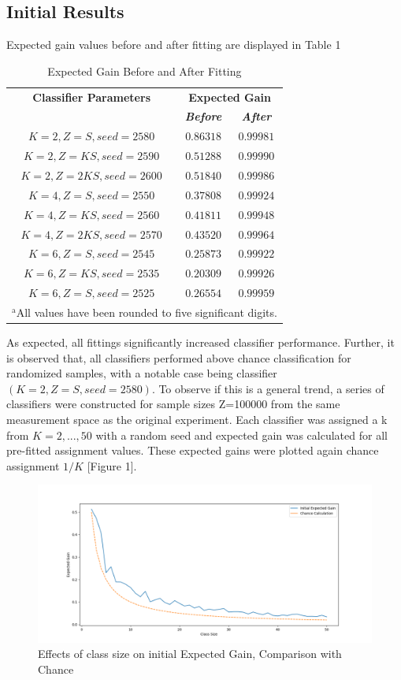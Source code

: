 \documentclass[10pt, conference]{IEEEtran}
\begin{document}
\subsection{Initial Results}
Expected gain values before and after fitting are displayed in Table 1
\begin{table}[htbp]
\caption{Expected Gain Before and After Fitting}
\begin{center}
\begin{tabular}{|c|c|c|}
\hline
\textbf{Classifier Parameters}&\multicolumn{2}{|c|}{\textbf{Expected Gain}} \\
\cline{2-3} 
\textbf{} & \textbf{\textit{Before}}& \textbf{\textit{After}}\\
\hline
$K=2,Z=S,seed=2580$&$0.86318$&$0.99981$\\
\hline
$K=2,Z=KS,seed=2590$&$0.51288$&$0.99990$ \\
\hline
$K=2,Z=2KS,seed=2600$&$0.51840$ & $0.99986$  \\
\hline
$K=4,Z=S,seed=2550$&$0.37808$&$0.99924$  \\
\hline
$K=4,Z=KS,seed=2560$&$0.41811$&$0.99948$  \\
\hline
$K=4,Z=2KS,seed=2570$&$0.43520$&$0.99964$ \\
\hline
$K=6,Z=S,seed=2545$&$0.25873$&$0.99922$ \\
\hline
$K=6,Z=KS,seed=2535$&$0.20309$&$0.99926$  \\
\hline
$K=6,Z=S,seed=2525$&$0.26554$&$0.99959$  \\
\hline
\multicolumn{3}{l}{$^{\mathrm{a}}$All values have been rounded to five significant digits.}
\end{tabular}
\label{tab1}
\end{center}
\end{table}
As expected, all fittings significantly increased classifier performance. Further, it is observed that, all classifiers performed  above chance classification for randomized samples, with a notable case being classifier $(K=2, Z=S, seed=2580)$. To observe if this is a general trend, a series of classifiers were constructed for sample sizes Z=100000 from the same measurement space as the original experiment.  Each classifier was assigned a k from $K=2,...,50$ with a random seed and expected gain was calculated for all pre-fitted assignment values. These expected gains were plotted again chance assignment $1/K$ [Figure 1]. 
\begin{figure}[htbp]
\centerline{\includegraphics[scale=0.23]{iterativeClassInitialComparison.png}}
\caption{Effects of class size on initial Expected Gain, Comparison with Chance}
\label{fig}
\end{figure}
\end{document}
